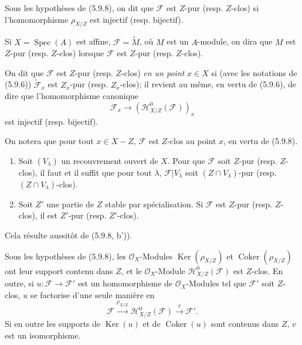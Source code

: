 \begin{definition}[5.9.9]
\label{IV.2.s5.9.9-fr}
Sous les hypothèses de (5.9.8), on dit que $\mathcal F$ est $Z$-pur
(resp. $Z$-clos) si l'homomorphisme $\rho_{X/Z}$ est injectif
(resp. bijectif).
\end{definition}

Si $X=\operatorname{Spec}(A)$ est affine, $\mathcal F=\widetilde M$, où
$M$ est un $A$-module, on dira que $M$ est $Z$-pur (resp. $Z$-clos) lorsque
$\mathcal F$ est $Z$-pur (resp. $Z$-clos).

On dit que $\mathcal F$ est $Z$-pur (resp. $Z$-clos) \emph{en un point}
$x\in X$ si (avec les notations de (5.9.6)) $\widetilde{\mathcal F}_x$ est
$Z_x$-pur (resp. $Z_x$-clos); il revient au même, en vertu de (5.9.6), de
dire que l'homomorphisme canonique
\[
\mathcal F_x\longrightarrow(\mathcal H^0_{X/Z}(\mathcal F))_x
\]
est injectif (resp. bijectif).

On notera que pour tout $x\in X-Z$, $\mathcal F$ est $Z$-clos au point $x$,
en vertu de (5.9.8).

\begin{corollary}[5.9.10]
\label{IV.2.s5.9.10-fr}
\begin{enumerate}
\item[(i)] Soit $(V_\lambda)$ un recouvrement ouvert de $X$. Pour que
$\mathcal F$ soit $Z$-pur (resp. $Z$-clos), il faut et il suffit que pour
tout $\lambda$, $\mathcal F|V_\lambda$ soit $(Z\cap V_\lambda)$-pur
(resp. $(Z\cap V_\lambda)$-clos).
\item[(ii)] Soit $Z'$ une partie de $Z$ stable par spécialisation. Si
$\mathcal F$ est $Z$-pur (resp. $Z$-clos), il est $Z'$-pur
(resp. $Z'$-clos).
\end{enumerate}
\end{corollary}

Cela résulte aussitôt de (5.9.8, b')).

\begin{proposition}[5.9.11]
\label{IV.2.s5.9.11-fr}
Sous les hypothèses de (5.9.8), les $\mathcal O_X$-Modules
$\operatorname{Ker}(\rho_{X/Z})$ et $\operatorname{Coker}(\rho_{X/Z})$ ont
leur support contenu dans $Z$, et le $\mathcal O_X$-Module
$\mathcal H^0_{X/Z}(\mathcal F)$ est $Z$-clos. En outre, si
$u:\mathcal F\to\mathcal F'$ est un homomorphisme de
$\mathcal O_X$-Modules tel que $\mathcal F'$ soit $Z$-clos, $u$ se factorise
d'une seule manière en
\[
\mathcal F\xrightarrow{\rho_{X/Z}}\mathcal H^0_{X/Z}(\mathcal F)
\xrightarrow{v}\mathcal F'.
\]
Si en outre les supports de $\operatorname{Ker}(u)$ et de
$\operatorname{Coker}(u)$ sont contenus dans $Z$, $v$ est un isomorphisme.
\end{proposition}


